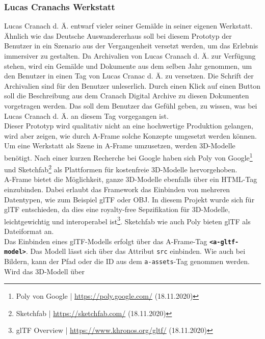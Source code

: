 \documentclass[a4paper,12pt,oneside]{article}
\begin{document}
      \subsubsection{Lucas Cranachs Werkstatt}
        Lucas Cranach d. Ä. entwarf vieler seiner Gemälde in seiner
        eigenen Werkstatt. Ähnlich wie das Deutsche Auswandererhaus soll
        bei diesem Prototyp der Benutzer in ein Szenario aus der Vergangenheit
        versetzt werden, um das Erlebnis immersiver zu gestalten. 
        Da Archivalien von Lucas Cranach d. Ä. zur 
        Verfügung stehen, wird ein Gemälde und 
        Dokumente aus dem selben Jahr genommen, um den Benutzer in einen
        Tag von Lucas Cranac d. Ä. zu versetzen. Die Schrift der Archivalien
        sind für den Benutzer unleserlich. Durch einen Klick
        auf einen Button soll die Beschreibung aus dem Cranach
        Digital Archive zu diesen Dokumenten vorgetragen werden. Das soll
        dem Benutzer das Gefühl geben, zu wissen, was bei Lucas Cranach d. Ä.
        an diesem Tag vorgegangen ist. \\
        Dieser Prototyp wird qualitativ nicht an eine hochwertige Produktion
        gelangen, wird aber zeigen, wie durch A-Frame solche Konzepte
        umgesetzt werden können. \\
        Um eine Werkstatt als Szene in A-Frame umzusetzen, werden 3D-Modelle
        benötigt. Nach einer kurzen Recherche bei Google haben sich
        Poly von Google\footnote{Poly von Google | \url{https://poly.google.com/} (18.11.2020)}
        und Sketchfab\footnote{Sketchfab | \url{https://sketchfab.com/} (18.11.2020)}
        als Plattformen für kostenfreie 3D-Modelle hervorgehoben. \\
        A-Frame bietet die Möglichkeit, ganze 3D-Modelle ebenfalls über ein
        HTML-Tag einzubinden. Dabei erlaubt das Framework das Einbinden von
        mehreren Datentypen, wie zum Beispiel glTF oder OBJ. In diesem Projekt
        wurde sich für glTF entschieden, da dies eine royalty-free Sepzifikation
        für 3D-Modelle, leichtgewichtig und interoperabel ist\footnote{glTF Overview | \url{https://www.khronos.org/gltf/} (18.11.2020)}.
        Sketchfab wie auch Poly bieten glTF als Dateiformat an. \\
        Das Einbinden eines glTF-Modells erfolgt über das A-Frame-Tag 
        \texttt{\textbf{<a-gltf-model>}}. Das Modell lässt sich über das Attribut
        \texttt{src} einbinden. Wie auch bei Bildern, kann der Pfad oder die ID
        aus dem \texttt{a-assets}-Tag genommen werden. Wird das 3D-Modell über
\end{document}
